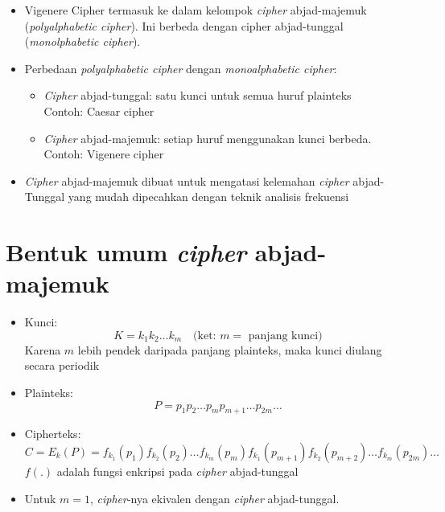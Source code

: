 \documentclass{article}
\begin{document}
\begin{itemize}
    \item Vigenere Cipher termasuk ke dalam kelompok \textit{cipher} abjad-majemuk (\textit{polyalphabetic cipher}). Ini berbeda dengan cipher abjad-tunggal (\textit{monolphabetic cipher}).
    \item Perbedaan \textit{polyalphabetic cipher} dengan \textit{monoalphabetic cipher}:
    \begin{itemize}
        \item[$\blacktriangleright$] \textit{Cipher} abjad-tunggal: satu kunci untuk semua huruf plainteks \\ Contoh: Caesar cipher
        \item[$\blacktriangleright$] \textit{Cipher} abjad-majemuk: setiap huruf menggunakan kunci berbeda. \\ Contoh: Vigenere cipher
    \end{itemize}
    \item \textit{Cipher} abjad-majemuk dibuat untuk mengatasi kelemahan \textit{cipher} abjad-Tunggal yang mudah dipecahkan dengan teknik analisis frekuensi
\end{itemize}

\newpage


\section*{Bentuk umum \textit{cipher} abjad-majemuk}

\begin{itemize}
    \item Kunci:
    \[ K = k_1 k_2 \dots k_m \quad \text{(ket: } m = \text{ panjang kunci)} \]
    Karena $m$ lebih pendek daripada panjang plainteks, maka kunci diulang secara periodik
    
    \item Plainteks:
    \[ P = p_1 p_2 \dots p_m p_{m+1} \dots p_{2m} \dots \]
    
    \item Cipherteks:
    \[ C = E_k(P) = f_{k_1}(p_1) f_{k_2}(p_2) \dots f_{k_m}(p_m) f_{k_1}(p_{m+1}) f_{k_2}(p_{m+2}) \dots f_{k_m}(p_{2m}) \dots \]
    $f(.)$ adalah fungsi enkripsi pada \textit{cipher} abjad-tunggal

    \item Untuk $m = 1$, \textit{cipher}-nya ekivalen dengan \textit{cipher} abjad-tunggal.
\end{itemize}
\end{document}
